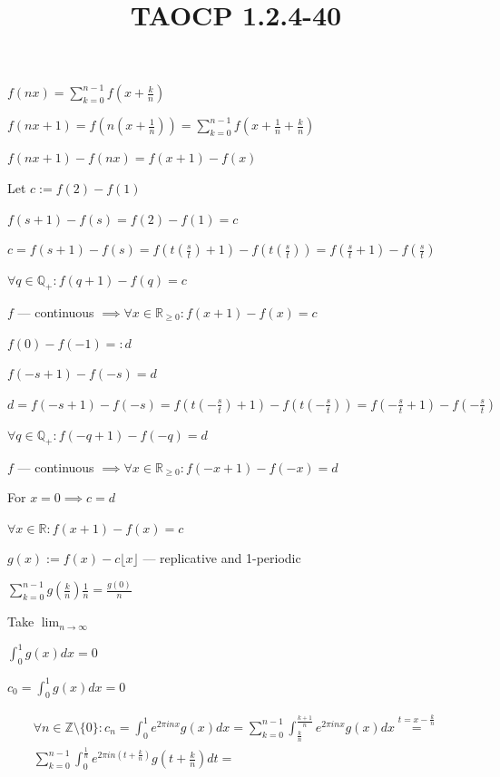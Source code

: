\documentclass{article}
\title{TAOCP 1.2.4\mbox{-}40}
\begin{document}
\maketitle

\( f(nx) = \sum_{k=0}^{n-1} f(x + \frac{k}{n}) \)

\( f(nx + 1) = f(n(x+\frac{1}{n})) = \sum_{k=0}^{n-1} f(x + \frac{1}{n} + \frac{k}{n}) \)

\( f(nx+1) - f(nx) = f(x + 1) - f(x) \)

Let \( c := f(2) - f(1) \)

\( f(s+1)-f(s) = f(2) - f(1) = c \)

\( c = f(s+1)-f(s) = f(t(\frac{s}{t}) + 1) - f(t(\frac{s}{t})) = f(\frac{s}{t} + 1) - f(\frac{s}{t}) \)

\( \forall q \in \mathbb{Q_+}: f(q+1) - f(q) = c \)

\( f \) --- continuous \( \implies \forall x \in \mathbb{R}_{\geq 0}: f(x+1)-f(x) = c \)

\( f(0) - f(-1) =: d \)

\( f(-s+1) - f(-s) = d \)

\( d = f(-s+1)-f(-s) = f(t(-\frac{s}{t}) + 1) - f(t(-\frac{s}{t})) = f(-\frac{s}{t} + 1) - f(-\frac{s}{t}) \)

\( \forall q \in \mathbb{Q_+}: f(-q+1) - f(-q) = d \)

\( f \) --- continuous \( \implies \forall x \in \mathbb{R}_{\geq 0}: f(-x+1)-f(-x) = d \)

For \( x = 0 \implies c = d \)

\( \forall x \in \mathbb{R}: f(x+1) - f(x) = c \)

\( g(x) := f(x) - c \lfloor x \rfloor \) --- replicative and 1-periodic

\( \sum_{k=0}^{n-1} g(\frac{k}{n})\frac{1}{n} = \frac{g(0)}{n} \)

Take \( \lim_{n \to \infty} \)

\( \int_{0}^{1} g(x) dx = 0 \)

\( c_{0} = \int_{0}^{1} g(x) dx = 0 \)

\begin{multline*}
\forall n \in \mathbb{Z} \setminus \{ 0 \}: c_{n} = \int_{0}^{1} e^{2\pi i n x} g(x) dx = \sum_{k=0}^{n-1} \int_{\frac{k}{n}}^{\frac{k+1}{n}} e^{2\pi i n x} g(x) dx \overset{t = x - \frac{k}{n}}{=} \\
\sum_{k=0}^{n-1} \int_{0}^{\frac{1}{n}} e^{2\pi i n (t + \frac{k}{n})} g(t + \frac{k}{n}) dt =
\end{multline*}
\end{document}
